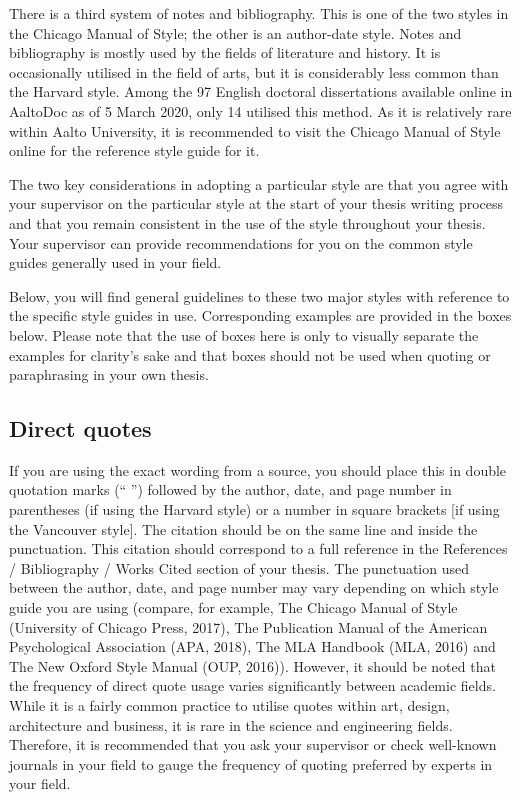 \documentclass[english, 12pt, a4paper, sci, utf8, a-2b, online]{aaltothesis}
\begin{document}
There is a third system of notes and bibliography. This is one of the two styles
in the Chicago Manual of Style; the other is an author-date style. Notes and 
bibliography is mostly used by the fields of literature and history. It is 
occasionally utilised in the field of arts, but it is considerably less common 
than the Harvard style. Among the 97 English doctoral dissertations available 
online in AaltoDoc as of 5 March 2020, only 14 utilised this method. As it is 
relatively rare within Aalto University, it is recommended to visit the Chicago 
Manual of Style online for the reference style guide for it.

The two key considerations in adopting a particular style are that you agree 
with your supervisor on the particular style at the start of your thesis writing
process and that you remain consistent in the use of the style throughout your 
thesis. Your supervisor can provide recommendations for you on the common style 
guides generally used in your field.

Below, you will find general guidelines to these two major styles with reference
to the specific style guides in use. Corresponding examples are provided in the 
boxes below. Please note that the use of boxes here is only to visually separate
the examples for clarity’s sake and that boxes should not be used when quoting 
or paraphrasing in your own thesis.


\subsection*{Direct quotes}

If you are using the exact wording from a source, you should place this in 
double quotation marks (“ ”) followed by the author, date, and page number in 
parentheses (if using the Harvard style) or a number in square brackets [if 
using the Vancouver style]. The citation should be on the same line and inside 
the punctuation. This citation should correspond to a full reference in the 
References / Bibliography / Works Cited section of your thesis. The punctuation 
used between the author, date, and page number may vary depending on which style
guide you are using (compare, for example, The Chicago Manual of Style 
(University of Chicago Press, 2017), The Publication Manual of the American 
Psychological Association (APA, 2018), The MLA Handbook (MLA, 2016) and The New 
Oxford Style Manual (OUP, 2016)). However, it should be noted that the frequency
of direct quote usage varies significantly between academic fields. While it is 
a fairly common practice to utilise quotes within art, design, architecture and 
business, it is rare in the science and engineering fields. Therefore, it is 
recommended that you ask your supervisor or check well-known journals in your 
field to gauge the frequency of quoting preferred by experts in your field.
\end{document}
